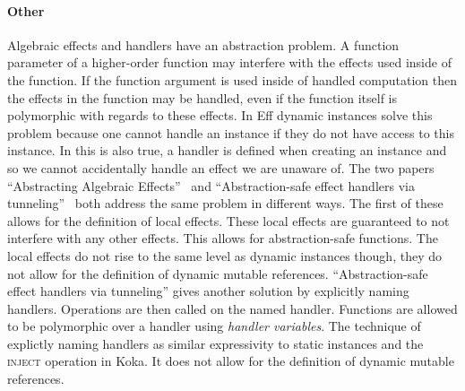 \paragraph{Other} Algebraic effects and handlers have an abstraction problem.
A function parameter of a higher-order function may interfere with the effects used inside of the function.
If the function argument is used inside of handled computation then the effects in the function may be handled, even if the function itself is polymorphic with regards to these effects.
In Eff dynamic instances solve this problem because one cannot handle an instance if they do not have access to this instance.
In \lang{} this is also true, a handler is defined when creating an instance and so we cannot accidentally handle an effect we are unaware of.
The two papers ``Abstracting Algebraic Effects''~\autocite{abstractingalgeffects} and ``Abstraction-safe effect handlers via tunneling''~\autocite{tunneling} both address the same problem in different ways.
The first of these allows for the definition of local effects.
These local effects are guaranteed to not interfere with any other effects.
This allows for abstraction-safe functions.
The local effects do not rise to the same level as dynamic instances though, they do not allow for the definition of dynamic mutable references.
``Abstraction-safe effect handlers via tunneling'' gives another solution by explicitly naming handlers.
Operations are then called on the named handler.
Functions are allowed to be polymorphic over a handler using \emph{handler variables}.
The technique of explictly naming handlers as similar expressivity to static instances and the \textsc{inject} operation in Koka.
It does not allow for the definition of dynamic mutable references.
\fi
